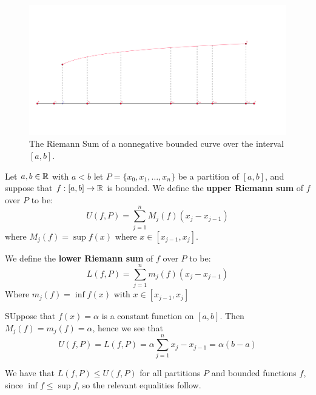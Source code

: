 \begin{figure}
    \centering
    \includegraphics[scale = 0.5]{figures/partitionOfACurve.png}
    \caption{The Riemann Sum of a nonnegative bounded curve over the interval $[a,b]$.}
    \label{fig_5.2}
\end{figure}

\begin{definition}
    Let $a,b \in \mathbb{R}$ with  $a<b$ let $P=\{x_0,x_1, \dots, x_n\}$ be a partition of  $[a,b]$, and suppose that  $f:[a,b] \rightarrow \mathbb{R}$ is bounded. 
    We define the  \textbf{upper Riemann sum} of $f$ over  $P$ to be:
     \begin{equation}
         U(f,P)=\sum_{j=1}^{n}{M_j(f)(x_j-x_{j-1})}		
    \end{equation} 
    where $M_j(f)=\sup{f(x)}$ where  $x \in [x_{j-1},x_j]$.

We define the \textbf{lower Riemann sum} of $f$ over  $P$ to be:
     \begin{equation}
         L(f,P)=\sum_{j=1}^{n}{m_j(f)(x_j-x_{j-1})}
    \end{equation}
    Where $m_j(f)=\inf{f(x)}$ with  $x \in [x_{j-1},x_j]$
\end{definition}

\begin{remark}
    SUppose that $f(x)=\alpha$ is a constant function on  $[a,b]$. Then  $M_j(f)=m_j(f)=\alpha$, hence we see that
        \begin{equation*}
            U(f,P)=L(f,P)=\alpha\sum_{j=1}^{n}{x_j-x_{j-1}}=\alpha(b-a)
        \end{equation*} 
\end{remark}

\begin{remark}
    We have that $L(f,P) \leq U(f,P)$ for all  partitions $P$ and bounded functions  $f$, since $\inf{f} \leq \sup{f}$, so the relevant equalities follow.
\end{remark}

